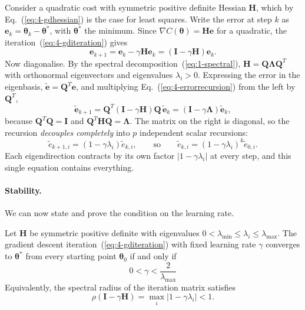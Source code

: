 Consider a quadratic cost with symmetric positive definite Hessian $\bm{H}$,
which by Eq.~(\ref{eq:4-gdhessian}) is the case for least squares.  Write the
error at step $k$ as $\bm{e}_k=\bm{\theta}_k-\bm{\theta}^{*}$, with
$\bm{\theta}^{*}$ the minimum.  Since $\nabla C(\bm{\theta})=\bm{H}\bm{e}$ for
a quadratic, the iteration~(\ref{eq:4-gditeration}) gives
\begin{equation}
  \bm{e}_{k+1} = \bm{e}_k - \gamma\bm{H}\bm{e}_k
               = \left(\bm{I}-\gamma\bm{H}\right)\bm{e}_k .
  \label{eq:4-errorrecursion}
\end{equation}
Now diagonalise.  By the spectral decomposition~(\ref{eq:1-spectral}),
$\bm{H}=\bm{Q}\bm{\Lambda}\bm{Q}^{T}$ with orthonormal eigenvectors and
eigenvalues $\lambda_i>0$.  Expressing the error in the eigenbasis,
$\tilde{\bm{e}}=\bm{Q}^{T}\bm{e}$, and multiplying
Eq.~(\ref{eq:4-errorrecursion}) from the left by $\bm{Q}^{T}$,
\begin{equation*}
  \tilde{\bm{e}}_{k+1}
   = \bm{Q}^{T}\left(\bm{I}-\gamma\bm{H}\right)\bm{Q}\,\tilde{\bm{e}}_k
   = \left(\bm{I}-\gamma\bm{\Lambda}\right)\tilde{\bm{e}}_k ,
\end{equation*}
because $\bm{Q}^{T}\bm{Q}=\bm{I}$ and $\bm{Q}^{T}\bm{H}\bm{Q}=\bm{\Lambda}$.
The matrix on the right is diagonal, so the recursion \emph{decouples
completely} into $p$ independent scalar recursions:
\begin{equation}
  \tilde{e}_{k+1,i} = \left(1-\gamma\lambda_i\right)\tilde{e}_{k,i},
  \qquad\text{so}\qquad
  \tilde{e}_{k,i} = \left(1-\gamma\lambda_i\right)^{k}\tilde{e}_{0,i} .
  \label{eq:4-decoupled}
\end{equation}
Each eigendirection contracts by its own factor $|1-\gamma\lambda_i|$ at every
step, and this single equation contains everything.

\paragraph{Stability.}
We can now state and prove the condition on the learning rate.

\begin{theorem}
\label{thm:4-gdstability}
Let $\bm{H}$ be symmetric positive definite with eigenvalues
$0<\lambda_{\min}\le\lambda_i\le\lambda_{\max}$.  The gradient descent
iteration~(\ref{eq:4-gditeration}) with fixed learning rate $\gamma$ converges
to $\bm{\theta}^{*}$ from every starting point $\bm{\theta}_0$ if and only if
\begin{equation}
  \boxed{\;0 < \gamma < \frac{2}{\lambda_{\max}} \;}
  \label{eq:4-stability}
\end{equation}
Equivalently, the spectral radius of the iteration matrix satisfies
\begin{equation}
  \rho\!\left(\bm{I}-\gamma\bm{H}\right)
   = \max_i\left|1-\gamma\lambda_i\right| < 1 .
  \label{eq:4-spectralradius}
\end{equation}
\end{theorem}

